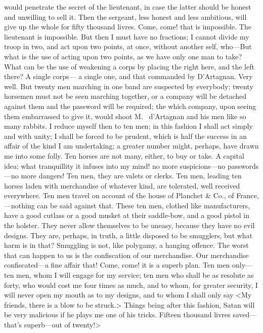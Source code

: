 would penetrate the secret of the lieutenant, in case the latter should be honest and unwilling to sell it. Then the sergeant, less honest and less ambitious, will give up the whole for fifty thousand livres. Come, come! that is impossible. The lieutenant is impossible. But then I must have no fractions; I cannot divide my troop in two, and act upon two points, at once, without another self, who—But what is the use of acting upon two points, as we have only one man to take? What can be the use of weakening a corps by placing the right here, and the left there? A single corps— a single one, and that commanded by D'Artagnan. Very well. But twenty men marching in one band are suspected by everybody; twenty horsemen must not be seen marching together, or a company will be detached against them and the password will be required; the which company, upon seeing them embarrassed to give it, would shoot M.~ d'Artagnan and his men like so many rabbits. I reduce myself then to ten men; in this fashion I shall act simply and with unity; I shall be forced to be prudent, which is half the success in an affair of the kind I am undertaking; a greater number might, perhaps, have drawn me into some folly. Ten horses are not many, either, to buy or take. A capital idea; what tranquillity it infuses into my mind! no more suspicions—no passwords—no more dangers! Ten men, they are valets or clerks. Ten men, leading ten horses laden with merchandise of whatever kind, are tolerated, well received everywhere. Ten men travel on account of the house of Planchet \& Co., of France,—nothing can be said against that. These ten men, clothed like manufacturers, have a good cutlass or a good musket at their saddle-bow, and a good pistol in the holster. They never allow themselves to be uneasy, because they have no evil designs. They are, perhaps, in truth, a little disposed to be smugglers, but what harm is in that? Smuggling is not, like polygamy, a hanging offence. The worst that can happen to us is the confiscation of our merchandise. Our merchandise confiscated—a fine affair that! Come, come! it is a superb plan. Ten men only—ten men, whom I will engage for my service; ten men who shall be as resolute as forty, who would cost me four times as much, and to whom, for greater security, I will never open my mouth as to my designs, and to whom I shall only say <My friends, there is a blow to be struck.> Things being after this fashion, Satan will be very malicious if he plays me one of his tricks. Fifteen thousand livres saved—that's superb—out of twenty!>

